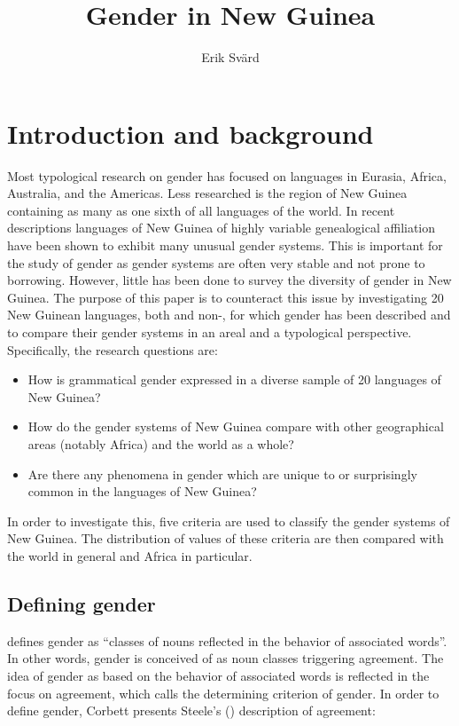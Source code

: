 \documentclass[output=collectionpaper]{langsci/langscibook}
\title{Gender in New Guinea}
\author{%
Erik Svärd
\affiliation{earlier Stockholm University}
}%
\begin{document}
\section{ Introduction and background}

Most typological research on gender has focused on languages in Eurasia, Africa, Australia, and the Americas. Less researched is the region of New Guinea containing as many as one sixth of all languages of the world. In recent descriptions languages of New Guinea of highly variable genealogical affiliation have been shown to exhibit many unusual gender systems. This is important for the study of gender as gender systems are often very stable and not prone to borrowing. However, little has been done to survey the diversity of gender in New Guinea. The purpose of this paper is to counteract this issue by investigating 20 New Guinean languages, both  and non-, for which gender has been described and to compare their gender systems in an areal and a typological perspective. Specifically, the research questions are:

\begin{itemize}
\item How is grammatical gender expressed in a diverse sample of 20 languages of New Guinea?

\item How do the gender systems of New Guinea compare with other geographical areas (notably Africa) and the world as a whole?

\item Are there any phenomena in gender which are unique to or surprisingly common in the languages of New Guinea?
\end{itemize}


In order to investigate this, five criteria are used to classify the gender systems of New Guinea. The distribution of values of these criteria are then compared with the world in general and Africa in particular.

\subsection{ Defining gender}

\citet[231]{Hockett1958} defines gender as ``classes of nouns reflected in the behavior of associated words''. In other words, gender is conceived of as noun classes triggering agreement. The idea of gender as based on the behavior of associated words is reflected in the focus on agreement, which \citet[4]{Corbett1991} calls the determining criterion of gender. In order to define gender, Corbett presents Steele's (\citealt*{Steele1978}) description of agreement:
\end{document}
